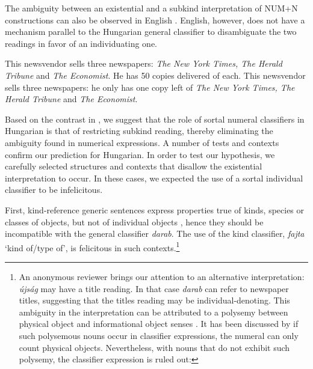 \documentclass[output=paper]{langscibook}
\begin{document}
\noindent The ambiguity between an existential and a subkind interpretation of NUM+N constructions can also be observed in English . English, however, does not have a mechanism parallel to the Hungarian general classifier to disambiguate the two readings in favor of an individuating one. 

\ea \label{schv-nem:ex:9}
\ea \label{schv-nem:ex:9a}
This newsvendor sells three newspapers: \textit{The New York Times, The Herald Tribune} and \textit{The Economist}. He has 50 copies delivered of each.
\ex \label{schv-nem:ex:9b}
This newsvendor sells three newspapers: he only has one copy left of \textit{The New York Times, The Herald Tribune} and \textit{The Economist}.
\z
\z

\noindent Based on the contrast in , we suggest that the role of sortal numeral classifiers in Hungarian is that of restricting subkind reading, thereby eliminating the ambiguity found in numerical expressions. A number of tests and contexts confirm our prediction for Hungarian. In order to test our hypothesis, we carefully selected structures and contexts that disallow the existential interpretation to occur. In these cases, we expected the use of a sortal individual classifier to be infelicitous.

\begin{sloppypar}
First, kind-reference generic sentences express properties true of kinds, species or classes of objects, but not of individual objects \citep{krifka-etal-95}, hence they should be incompatible with the general classifier \textit{darab}. The use of the kind classifier, \textit{fajta} `kind of/type of', is felicitous in such contexts.\footnote{An anonymous reviewer brings our attention to an alternative interpretation: \textit{újság} may have a title reading. In that case \textit{darab} can refer to newspaper titles, suggesting that the titles reading may be individual-denoting. This ambiguity in the interpretation can be attributed to a polysemy between physical object and informational object senses \citep{puste95, asher-11}. It has been discussed by \citet{schvarcz-wohlmuth-20} if such polysemous  nouns occur in classifier expressions, the numeral can only count physical objects. Nevertheless, with nouns that do not exhibit such polysemy, the classifier expression is ruled out: 

\z}\end{sloppypar} 
\end{document}

